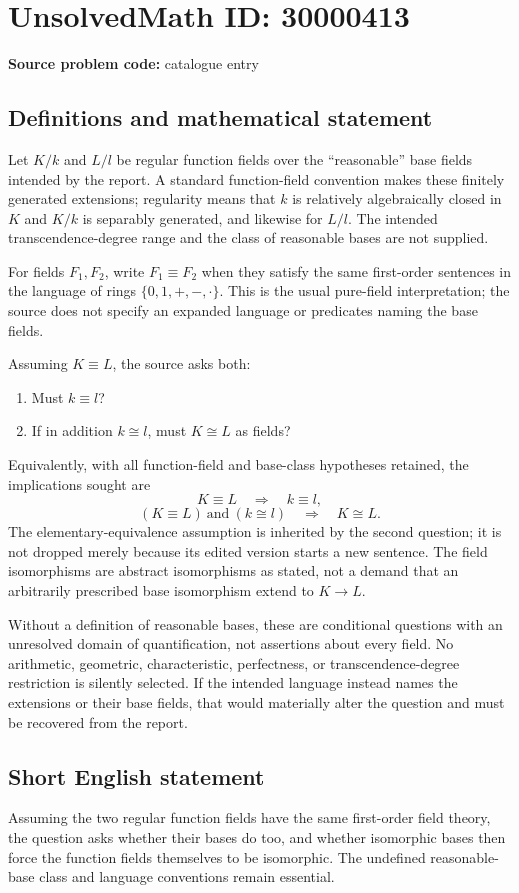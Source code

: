 \documentclass[11pt]{article}
\begin{document}
\section*{UnsolvedMath ID: 30000413}
\textbf{Source problem code:} catalogue entry
\subsection{Definitions and mathematical statement}
Let $K/k$ and $L/l$ be regular function fields over the ``reasonable'' base fields intended by the report. A standard function-field convention makes these finitely generated extensions; regularity means that $k$ is relatively algebraically closed in $K$ and $K/k$ is separably generated, and likewise for $L/l$. The intended transcendence-degree range and the class of reasonable bases are not supplied.

For fields $F_1,F_2$, write $F_1\equiv F_2$ when they satisfy the same first-order sentences in the language of rings $\{0,1,+,-,\cdot\}$. This is the usual pure-field interpretation; the source does not specify an expanded language or predicates naming the base fields.

Assuming $K\equiv L$, the source asks both:
\begin{enumerate}
\item Must $k\equiv l$?
\item If in addition $k\cong l$, must $K\cong L$ as fields?
\end{enumerate}
Equivalently, with all function-field and base-class hypotheses retained, the implications sought are
\[
 K\equiv L\quad\Longrightarrow\quad k\equiv l,
\]
\[
 (K\equiv L)\ \text{and}\ (k\cong l)
       \quad\Longrightarrow\quad K\cong L.
\]
The elementary-equivalence assumption is inherited by the second question; it is not dropped merely because its edited version starts a new sentence. The field isomorphisms are abstract isomorphisms as stated, not a demand that an arbitrarily prescribed base isomorphism extend to $K\to L$.

Without a definition of reasonable bases, these are conditional questions with an unresolved domain of quantification, not assertions about every field. No arithmetic, geometric, characteristic, perfectness, or transcendence-degree restriction is silently selected. If the intended language instead names the extensions or their base fields, that would materially alter the question and must be recovered from the report.
\subsection{Short English statement}
Assuming the two regular function fields have the same first-order field theory, the question asks whether their bases do too, and whether isomorphic bases then force the function fields themselves to be isomorphic. The undefined reasonable-base class and language conventions remain essential.
\end{document}
